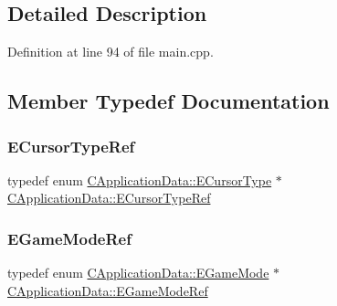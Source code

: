 \subsection{Detailed Description}


Definition at line 94 of file main.\+cpp.



\subsection{Member Typedef Documentation}
\hypertarget{classCApplicationData_acaef079bdad1f957a327d36fa6ee8c81}{}\label{classCApplicationData_acaef079bdad1f957a327d36fa6ee8c81} 
\subsubsection{\texorpdfstring{E\+Cursor\+Type\+Ref}{ECursorTypeRef}}
{\footnotesize\ttfamily typedef  enum \hyperlink{classCApplicationData_ad024b66b60017c45c47a85dbc636ae69}{C\+Application\+Data\+::\+E\+Cursor\+Type} $\ast$ \hyperlink{classCApplicationData_acaef079bdad1f957a327d36fa6ee8c81}{C\+Application\+Data\+::\+E\+Cursor\+Type\+Ref}\hspace{0.3cm}{\ttfamily [protected]}}

\hypertarget{classCApplicationData_ab56fe2209f0f43e42eef3fb09cf64029}{}\label{classCApplicationData_ab56fe2209f0f43e42eef3fb09cf64029} 
\subsubsection{\texorpdfstring{E\+Game\+Mode\+Ref}{EGameModeRef}}
{\footnotesize\ttfamily typedef  enum \hyperlink{classCApplicationData_ac8ac37a4c8bb871036fbbdc6a072e403}{C\+Application\+Data\+::\+E\+Game\+Mode} $\ast$ \hyperlink{classCApplicationData_ab56fe2209f0f43e42eef3fb09cf64029}{C\+Application\+Data\+::\+E\+Game\+Mode\+Ref}\hspace{0.3cm}{\ttfamily [protected]}}

\hypertarget{classCApplicationData_acfb51c61ccc20a0cd5daa02973ab0870}{}\label{classCApplicationData_acfb51c61ccc20a0cd5daa02973ab0870} 

